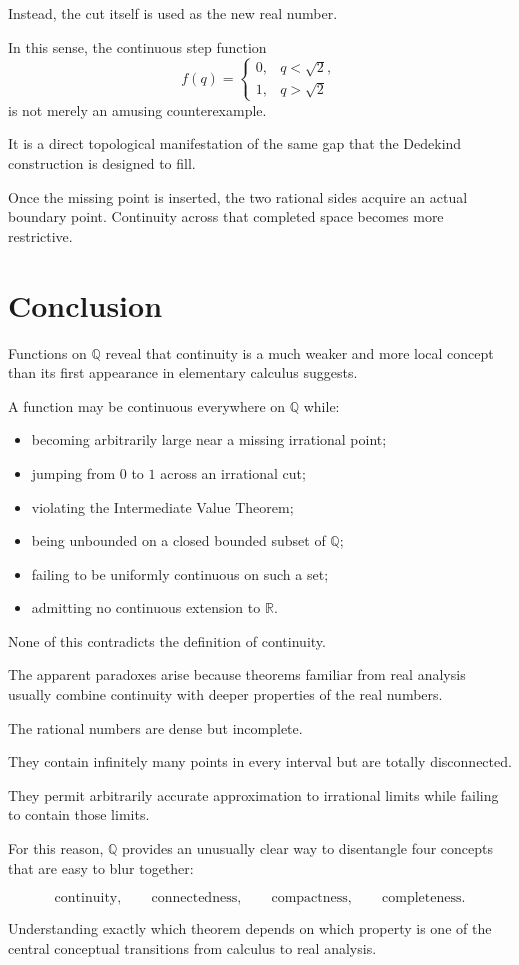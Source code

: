 \documentclass{essay}
\begin{document}
Instead, the cut itself is used as the new real number.

In this sense, the continuous step function
\[
f(q)=
\begin{cases}
0,&q<\sqrt{2},\\
1,&q>\sqrt{2}
\end{cases}
\]
is not merely an amusing counterexample.

It is a direct topological manifestation of the same gap that the Dedekind
construction is designed to fill.

Once the missing point is inserted, the two rational sides acquire an actual
boundary point. Continuity across that completed space becomes more
restrictive.

\section{Conclusion}

Functions on \(\mathbb{Q}\) reveal that continuity is a much weaker and more
local concept than its first appearance in elementary calculus suggests.

A function may be continuous everywhere on \(\mathbb{Q}\) while:

\begin{itemize}
    \item becoming arbitrarily large near a missing irrational point;
    \item jumping from \(0\) to \(1\) across an irrational cut;
    \item violating the Intermediate Value Theorem;
    \item being unbounded on a closed bounded subset of \(\mathbb{Q}\);
    \item failing to be uniformly continuous on such a set;
    \item admitting no continuous extension to \(\mathbb{R}\).
\end{itemize}

None of this contradicts the definition of continuity.

The apparent paradoxes arise because theorems familiar from real analysis
usually combine continuity with deeper properties of the real numbers.

The rational numbers are dense but incomplete.

They contain infinitely many points in every interval but are totally
disconnected.

They permit arbitrarily accurate approximation to irrational limits while
failing to contain those limits.

For this reason, \(\mathbb{Q}\) provides an unusually clear way to disentangle
four concepts that are easy to blur together:

\[
\boxed{
\text{continuity},
\qquad
\text{connectedness},
\qquad
\text{compactness},
\qquad
\text{completeness}.
}
\]

Understanding exactly which theorem depends on which property is one of the
central conceptual transitions from calculus to real analysis.
\end{document}
